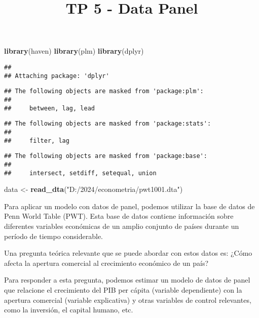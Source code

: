 \documentclass[
]{article}
\title{TP 5 - Data Panel}
\author{}
\date{\vspace{-2.5em}}
\newenvironment{Shaded}{\begin{snugshade}}{\end{snugshade}}
\newcommand{\FunctionTok}[1]{\textcolor[rgb]{0.13,0.29,0.53}{\textbf{#1}}}
\newcommand{\NormalTok}[1]{#1}
\newcommand{\OtherTok}[1]{\textcolor[rgb]{0.56,0.35,0.01}{#1}}
\newcommand{\StringTok}[1]{\textcolor[rgb]{0.31,0.60,0.02}{#1}}
\begin{document}
\maketitle

\begin{Shaded}
\begin{Highlighting}[]
\FunctionTok{library}\NormalTok{(haven)}
\FunctionTok{library}\NormalTok{(plm)}
\FunctionTok{library}\NormalTok{(dplyr)}
\end{Highlighting}
\end{Shaded}

\begin{verbatim}
## 
## Attaching package: 'dplyr'
\end{verbatim}

\begin{verbatim}
## The following objects are masked from 'package:plm':
## 
##     between, lag, lead
\end{verbatim}

\begin{verbatim}
## The following objects are masked from 'package:stats':
## 
##     filter, lag
\end{verbatim}

\begin{verbatim}
## The following objects are masked from 'package:base':
## 
##     intersect, setdiff, setequal, union
\end{verbatim}

\begin{Shaded}
\begin{Highlighting}[]
\NormalTok{data }\OtherTok{\textless{}{-}} \FunctionTok{read\_dta}\NormalTok{(}\StringTok{"D:/2024/econometria/pwt1001.dta"}\NormalTok{)}
\end{Highlighting}
\end{Shaded}

Para aplicar un modelo con datos de panel, podemos utilizar la base de
datos de Penn World Table (PWT). Esta base de datos contiene información
sobre diferentes variables económicas de un amplio conjunto de países
durante un período de tiempo considerable.

Una pregunta teórica relevante que se puede abordar con estos datos es:
¿Cómo afecta la apertura comercial al crecimiento económico de un país?

Para responder a esta pregunta, podemos estimar un modelo de datos de
panel que relacione el crecimiento del PIB per cápita (variable
dependiente) con la apertura comercial (variable explicativa) y otras
variables de control relevantes, como la inversión, el capital humano,
etc.
\end{document}
